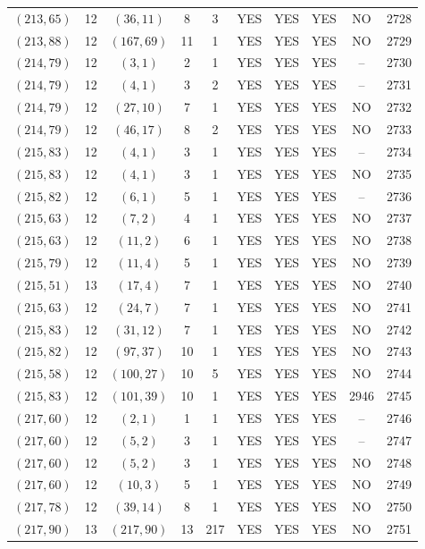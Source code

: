 \begin{longtable}{|c|c|c|c|c|c|c|c|c|c|}
$(213, 65)$ & 12 & $(36, 11)$ & 8 & 3 & YES & YES & YES & NO & 2728\\
$(213, 88)$ & 12 & $(167, 69)$ & 11 & 1 & YES & YES & YES & NO & 2729\\
$(214, 79)$ & 12 & $(3, 1)$ & 2 & 1 & YES & YES & YES & -- & 2730\\
$(214, 79)$ & 12 & $(4, 1)$ & 3 & 2 & YES & YES & YES & -- & 2731\\
$(214, 79)$ & 12 & $(27, 10)$ & 7 & 1 & YES & YES & YES & NO & 2732\\
$(214, 79)$ & 12 & $(46, 17)$ & 8 & 2 & YES & YES & YES & NO & 2733\\
$(215, 83)$ & 12 & $(4, 1)$ & 3 & 1 & YES & YES & YES & -- & 2734\\
$(215, 83)$ & 12 & $(4, 1)$ & 3 & 1 & YES & YES & YES & NO & 2735\\
$(215, 82)$ & 12 & $(6, 1)$ & 5 & 1 & YES & YES & YES & -- & 2736\\
$(215, 63)$ & 12 & $(7, 2)$ & 4 & 1 & YES & YES & YES & NO & 2737\\
$(215, 63)$ & 12 & $(11, 2)$ & 6 & 1 & YES & YES & YES & NO & 2738\\
$(215, 79)$ & 12 & $(11, 4)$ & 5 & 1 & YES & YES & YES & NO & 2739\\
$(215, 51)$ & 13 & $(17, 4)$ & 7 & 1 & YES & YES & YES & NO & 2740\\
$(215, 63)$ & 12 & $(24, 7)$ & 7 & 1 & YES & YES & YES & NO & 2741\\
$(215, 83)$ & 12 & $(31, 12)$ & 7 & 1 & YES & YES & YES & NO & 2742\\
$(215, 82)$ & 12 & $(97, 37)$ & 10 & 1 & YES & YES & YES & NO & 2743\\
$(215, 58)$ & 12 & $(100, 27)$ & 10 & 5 & YES & YES & YES & NO & 2744\\
$(215, 83)$ & 12 & $(101, 39)$ & 10 & 1 & YES & YES & YES & 2946 & 2745\\
$(217, 60)$ & 12 & $(2, 1)$ & 1 & 1 & YES & YES & YES & -- & 2746\\
$(217, 60)$ & 12 & $(5, 2)$ & 3 & 1 & YES & YES & YES & -- & 2747\\
$(217, 60)$ & 12 & $(5, 2)$ & 3 & 1 & YES & YES & YES & NO & 2748\\
$(217, 60)$ & 12 & $(10, 3)$ & 5 & 1 & YES & YES & YES & NO & 2749\\
$(217, 78)$ & 12 & $(39, 14)$ & 8 & 1 & YES & YES & YES & NO & 2750\\
$(217, 90)$ & 13 & $(217, 90)$ & 13 & 217 & YES & YES & YES & NO & 2751\\

\end{longtable}
